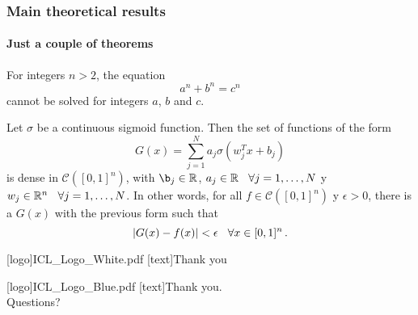 \documentclass[
	aspectratio=169, %
	t, %
	onlytextwidth, %
	10pt, %
]{beamer}
\begin{document}
\begin{frame}
	\frametitle{Main theoretical results}
	\framesubtitle{Just a couple of theorems}
	
	\begin{theorem}
		For integers $n>2$, the equation
		\[ a^n + b^n = c^n \]
		cannot be solved for integers $a$, $b$ and $c$.
	\end{theorem}

	\begin{theorem}
		\label{teo:AU}
		Let $\sigma$ be a continuous sigmoid function. Then the set of functions of the form
		$$ G(x) = \displaystyle \sum^N_{j=1}a_j\sigma(w^T_jx+b_j)$$
		is dense in $\mathcal{C}([0,1]^n)$, with $\b_j \in \mathbb{R}$, $a_j\in \mathbb{R} \hspace{.25cm}\, \forall j=1,\dots,N$ y $w_j \in \mathbb{R}^n \hspace{.25cm}\, \forall j=1,\dots,N$.
		In other words, for all $f\in\mathcal{C}([0,1]^n)$ y $\epsilon>0$, there is a $G(x)$ with the previous form such that
		$$ |G(x)-f(x)|<\epsilon \hspace{.25cm}\, \forall x\in [0,1]^n\,.$$
	\end{theorem}

\end{frame}




\begingroup
	[logo]{ICL_Logo_White.pdf} %
	[text]{Thank you} %
	
\endgroup



\begingroup
	[logo]{ICL_Logo_Blue.pdf} %
	[text]{Thank you.\\ Questions?} %
	
\end{document}
